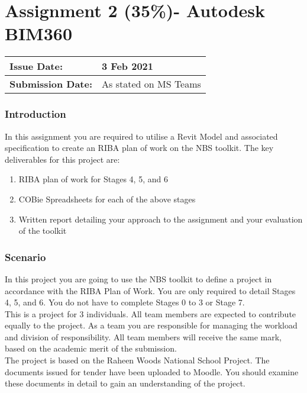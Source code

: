 
	

\part*{Assignment 2 (35\%)- Autodesk BIM360}


\begin{tabularx}{\textwidth}{ |X|X| }
	\hline
	\textbf{Issue Date:} & 3 Feb 2021\\
	\hline 
	\textbf{Submission Date:}  & As stated on MS Teams\\
	\hline
\end{tabularx}

\section*{Introduction}

In this assignment you are required to utilise a Revit Model and associated specification to create an RIBA plan of work on the NBS toolkit.  The key deliverables for this project are:

\begin{enumerate}
	\item RIBA plan of work for Stages 4, 5, and 6 
	\item COBie Spreadsheets for each of the above stages
	\item Written report detailing your approach to the assignment and your evaluation of the toolkit
\end{enumerate}

\section*{Scenario}



In this project you are going to use the NBS toolkit to define a project in accordance with the RIBA Plan of Work. You are only required to detail Stages 4, 5, and 6. You do not have to complete Stages 0 to 3 or Stage 7.\\


This is a project for 3 individuals. All team members are expected to contribute equally to the project. As a team you are responsible for managing the workload and division of responsibility. All team members will receive the same mark, based on the academic merit of the submission.\\


The project is based on the Raheen Woods National School Project. The documents issued for tender have been uploaded to Moodle. You should examine these documents in detail to gain an understanding of the project.\\


